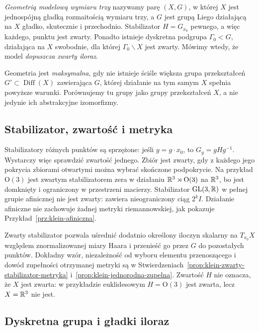 \begin{definicja}
\label{def:thurston-model}
\emph{Geometrią modelową wymiaru trzy} nazywamy parę $(X,G)$,
w której $X$ jest jednospójną gładką rozmaitością wymiaru trzy,
a $G$ jest grupą Liego działającą na $X$ gładko, skutecznie
i przechodnio. Stabilizator $H=G_{x_0}$ pewnego, a więc każdego,
punktu jest zwarty. Ponadto istnieje dyskretna podgrupa
$\Gamma_0<G$, działająca na $X$ swobodnie, dla której
$\Gamma_0\backslash X$ jest zwarty. Mówimy wtedy, że model
\emph{dopuszcza zwarty iloraz}.

Geometria jest \emph{maksymalna}, gdy nie istnieje ściśle większa
grupa przekształceń $G'\subset\operatorname{Diff}(X)$ zawierająca
$G$, której działanie na tym samym $X$ spełnia powyższe warunki.
Porównujemy tu grupy jako grupy przekształceń $X$, a nie jedynie
ich abstrakcyjne izomorfizmy.
\end{definicja}

\subsection*{Stabilizator, zwartość i metryka}

Stabilizatory różnych punktów są sprzężone: jeśli $y=g\cdot x_0$,
to $G_y=gHg^{-1}$. Wystarczy więc sprawdzić zwartość jednego.
Zbiór jest zwarty, gdy z każdego jego pokrycia zbiorami otwartymi
można wybrać skończone podpokrycie. Na przykład
$\mathrm O(3)$ jest zwartym stabilizatorem zera w działaniu
$\mathbb{R}^3\rtimes\mathrm O(3)$ na $\mathbb{R}^3$, bo jest domknięty i ograniczony
w przestrzeni macierzy. Stabilizator $\mathrm{GL}(3,\mathbb{R})$ w pełnej
grupie afinicznej nie jest zwarty: zawiera nieograniczony ciąg
$2^k I$. Działanie afiniczne nie zachowuje żadnej metryki
riemannowskiej, jak pokazuje Przykład~\ref{prz:klein-afiniczna}.

Zwarty stabilizator pozwala uśrednić dodatnio określony iloczyn
skalarny na $T_{x_0}X$ względem znormalizowanej miary Haara
i przenieść go przez $G$ do pozostałych punktów. Dokładny wzór,
niezależność od wyboru elementu przenoszącego i dowód zupełności
otrzymanej metryki są w
Stwierdzeniach~\ref{prop:klein-zwarty-stabilizator-metryka}
i~\ref{prop:klein-jednorodna-zupelna}.
Zwartość $H$ nie oznacza, że $X$ jest zwarta: w przykładzie
euklidesowym $H=\mathrm O(3)$ jest zwarta, lecz $X=\mathbb{R}^3$ nie jest.

\subsection*{Dyskretna grupa i gładki iloraz}

